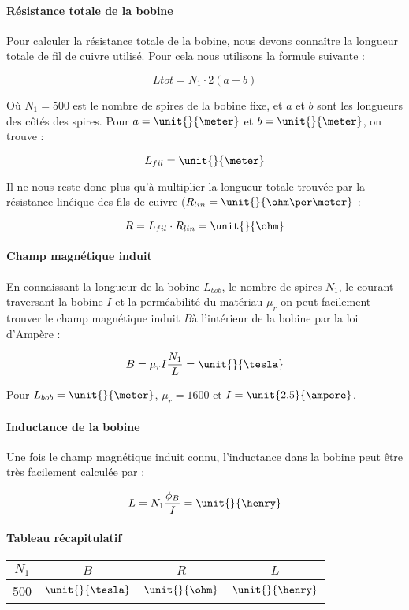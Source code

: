 \paragraph{Résistance totale de la bobine}
Pour calculer la résistance totale de la bobine, nous devons connaître la longueur totale de fil de cuivre utilisé.
Pour cela nous utilisons la formule suivante :

$$L{tot} = N_1 \cdot 2(a + b)$$

Où $N_1 = 500$ est le nombre de spires de la bobine fixe, et $a$ et $b$ sont les longueurs des côtés des spires. Pour
$a = \unit{}{\meter}$ et $b = \unit{}{\meter}$, on trouve :

$$L_{fil} = \unit{}{\meter}$$

Il ne nous reste donc plus qu'à multiplier la longueur totale trouvée par la résistance linéique des fils de cuivre
($R_{lin} = \unit{}{\ohm\per\meter}$ :

$$R = L_{fil} \cdot R_{lin} = \unit{}{\ohm}$$

\paragraph{Champ magnétique induit}
En connaissant la longueur de la bobine $L_{bob}$, le nombre de spires $N_1$, le courant traversant la bobine $I$ et
la perméabilité du matériau $\mu_r$ on peut facilement trouver le champ magnétique induit $B $à l'intérieur de la bobine 
par la loi d'Ampère :

$$B = \mu_rI \frac{N_1}{L} = \unit{}{\tesla}$$

Pour $L_{bob} = \unit{}{\meter}$, $\mu_r = 1600$ et $I = \unit{2.5}{\ampere}$.

\paragraph{Inductance de la bobine}
Une fois le champ magnétique induit connu, l'inductance dans la bobine peut être très facilement calculée par :

$$L = N_1 \frac{\phi_B}{I} = \unit{}{\henry}$$

\paragraph{Tableau récapitulatif}

\begin{center}
	\begin{tabular}{c|c|c|c}
		$N_1$ & $B$ & $R$ & $L$ \\
		\hline
		500 & $\unit{}{\tesla}$ & $\unit{}{\ohm}$ & $\unit{}{\henry}$ \\
	\end{tabular}
\end{center}

